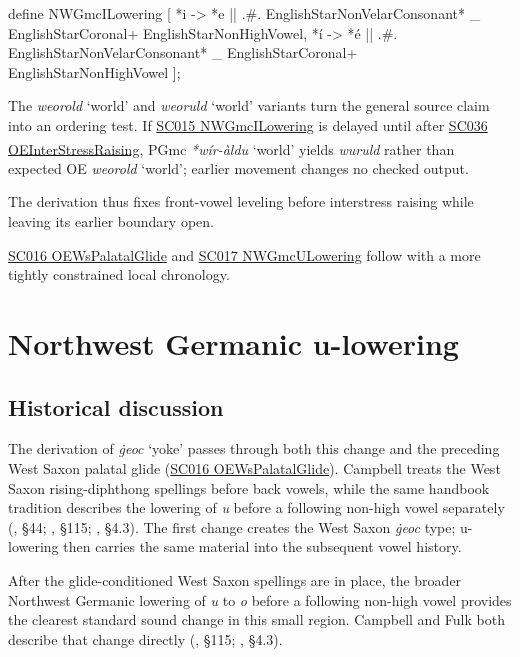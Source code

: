 \documentclass[
  british,
  a4paper,
  openany]{book}
\providecommand{\Pred}[1]{\textsuperscript{\dag}\emph{#1}}
\providecommand{\Recon}[1]{\emph{*#1}}
{\catcode`→=\active \global\def→{\ensuremath{\rightarrow}}}
\providecommand{\Pred}[1]{\textsuperscript{\dag}\emph{#1}}
\providecommand{\Recon}[1]{\emph{*#1}}
{\catcode`→=\active \global\def→{\ensuremath{\rightarrow}}}
\begin{document}
\begin{ReaderFacingFoma}
define NWGmcILowering [
    {*i} -> {*e}
        || .#. EnglishStarNonVelarConsonant* _
           EnglishStarCoronal+ EnglishStarNonHighVowel,
    {*í} -> {*é}
        || .#. EnglishStarNonVelarConsonant* _
           EnglishStarCoronal+ EnglishStarNonHighVowel
];
\end{ReaderFacingFoma}

The \emph{weorold} `world' and \emph{weoruld} `world' variants turn the
general source claim into an ordering test. If
\hyperref[rule-NWGmcILowering]{SC015 NWGmcILowering} is delayed until
after \hyperref[rule-OEInterStressRaising]{SC036 OEInterStressRaising},
PGmc \Recon{wír-àldu} `world' yields \Pred{wuruld} rather than expected
OE \emph{weorold} `world'; earlier movement changes no checked output.

The derivation thus fixes front-vowel leveling before interstress
raising while leaving its earlier boundary open.

\hyperref[rule-OEWsPalatalGlide]{SC016 OEWsPalatalGlide} and
\hyperref[rule-NWGmcULowering]{SC017 NWGmcULowering} follow with a more
tightly constrained local chronology.

\newpage

\section{Northwest Germanic
u-lowering}\label{northwest-germanic-u-lowering}

\subsection{Historical discussion}\label{historical-discussion-11}

The derivation of \emph{ġeoc} `yoke' passes through both this change and
the preceding West Saxon palatal glide
(\hyperref[rule-OEWsPalatalGlide]{SC016 OEWsPalatalGlide}). Campbell
treats the West Saxon rising-diphthong spellings before back vowels,
while the same handbook tradition describes the lowering of \emph{u}
before a following non-high vowel separately
(, §44;
, §115;
, §4.3). The first change creates
the West Saxon \emph{ġeoc} type; u-lowering then carries the same
material into the subsequent vowel history.

After the glide-conditioned West Saxon spellings are in place, the
broader Northwest Germanic lowering of \emph{u} to \emph{o} before a
following non-high vowel provides the clearest standard sound change in
this small region. Campbell and Fulk both describe that change directly
(, §115;
, §4.3).
\end{document}
